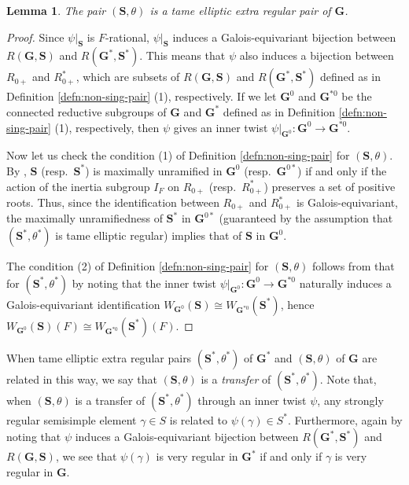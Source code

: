 \documentclass{amsart}
\newcommand{\bfG}{\mathbf{G}}
\newcommand{\bfS}{\mathbf{S}}
\theoremstyle{plain}
\newtheorem{lem}[thm]{Lemma}
\theoremstyle{definition}
\theoremstyle{remark}
\theoremstyle{theorem}
\begin{document}
\begin{lem}\label{lem:TERP-transfer}
The pair $(\bfS,\theta)$ is a tame elliptic extra regular pair of $\bfG$.
\end{lem}

\begin{proof}
Since $\psi|_{\bfS}$ is $F$-rational, $\psi|_{\bfS}$ induces a Galois-equivariant bijection between $R(\bfG,\bfS)$ and $R(\bfG^{\ast},\bfS^{\ast})$.
This means that $\psi$ also induces a bijection between $R_{0+}$ and $R^{\ast}_{0+}$, which are subsets of $R(\bfG,\bfS)$ and $R(\bfG^{\ast},\bfS^{\ast})$ defined as in Definition \ref{defn:non-sing-pair} (1), respectively.
If we let $\bfG^{0}$ and $\bfG^{\ast0}$ be the connected reductive subgroups of $\bfG$ and $\bfG^{\ast}$ defined as in Definition \ref{defn:non-sing-pair} (1), respectively, then $\psi$ gives an inner twist $\psi|_{\bfG^{0}}\colon\bfG^{0}\rightarrow\bfG^{\ast0}$.

Now let us check the condition (1) of Definition \ref{defn:non-sing-pair} for $(\bfS,\theta)$.
By \cite[Fact 3.4.1]{Kal19}, $\bfS$ (resp.\ $\bfS^{\ast}$) is maximally unramified in $\bfG^{0}$ (resp.\ $\bfG^{0\ast}$) if and only if the action of the inertia subgroup $I_{F}$ on $R_{0+}$ (resp.\ $R^{\ast}_{0+}$) preserves a set of positive roots.
Thus, since the identification between $R_{0+}$ and $R^{\ast}_{0+}$ is Galois-equivariant, the maximally unramifiedness of $\bfS^{\ast}$ in $\bfG^{0\ast}$ (guaranteed by the assumption that $(\bfS^{\ast},\theta^{\ast})$ is tame elliptic regular) implies that of $\bfS$ in $\bfG^{0}$.

The condition (2) of Definition \ref{defn:non-sing-pair} for $(\bfS,\theta)$ follows from that for $(\bfS^{\ast},\theta^{\ast})$ by noting that the inner twist $\psi|_{\bfG^{0}}\colon\bfG^{0}\rightarrow\bfG^{\ast0}$ naturally induces a Galois-equivariant identification $W_{\bfG^{0}}(\bfS)\cong W_{\bfG^{\ast0}}(\bfS^{\ast})$, hence $W_{\bfG^{0}}(\bfS)(F)\cong W_{\bfG^{\ast0}}(\bfS^{\ast})(F)$.
\end{proof}

When tame elliptic extra regular pairs $(\bfS^{\ast},\theta^{\ast})$ of $\bfG^{\ast}$ and $(\bfS,\theta)$ of $\bfG$ are related in this way, we say that $(\bfS,\theta)$ is a \textit{transfer} of $(\bfS^{\ast},\theta^{\ast})$.
Note that, when $(\bfS,\theta)$ is a transfer of $(\bfS^{\ast},\theta^{\ast})$ through an inner twist $\psi$, any strongly regular semisimple element $\gamma\in S$ is related to $\psi(\gamma)\in S^{\ast}$.
Furthermore, again by noting that $\psi$ induces a Galois-equivariant bijection between $R(\bfG^{\ast},\bfS^{\ast})$ and $R(\bfG,\bfS)$, we see that $\psi(\gamma)$ is very regular in $\bfG^{\ast}$ if and only if $\gamma$ is very regular in $\bfG$.
\end{document}
